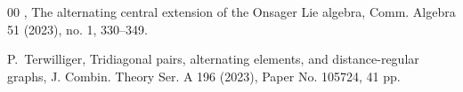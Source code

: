 \documentclass[11pt]{article}%
\theoremstyle{definition}
\theoremstyle{plain}
\begin{document}
\begin{thebibliography}{00}
,
	\newblock The alternating central extension of the Onsager Lie algebra, 
	\newblock Comm. Algebra 51 (2023), no. 1, 330--349.



 {P.~Terwilliger},
	Tridiagonal pairs, alternating elements, and distance-regular graphs,
	J. Combin. Theory Ser. A 196 (2023), Paper No. 105724, 41 pp.

\end{thebibliography}
\end{document}
